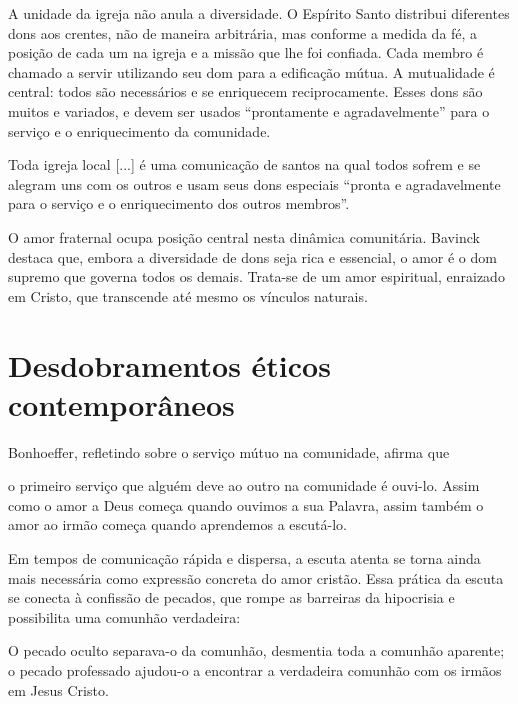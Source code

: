 A unidade da igreja não anula a diversidade. O Espírito Santo distribui diferentes dons aos crentes, não de maneira arbitrária, mas conforme a medida da fé, a posição de cada um na igreja e a missão que lhe foi confiada. \cite{bavinck2012} Cada membro é chamado a servir utilizando seu dom para a edificação mútua. A mutualidade é central: todos são necessários e se enriquecem reciprocamente. Esses dons são muitos e variados, e devem ser usados ``prontamente e agradavelmente'' para o serviço e o enriquecimento da comunidade.\cite{bavinck2012}

\begin{citacao}
    Toda igreja local [...] é uma comunicação de santos na qual todos sofrem e se alegram uns com os outros e usam seus dons especiais ``pronta e agradavelmente para o serviço e o enriquecimento dos outros membros''. \cite[p.~380]{bavinck2012}
\end{citacao}

O amor fraternal ocupa posição central nesta dinâmica comunitária. Bavinck destaca que, embora a diversidade de dons seja rica e essencial, o amor é o dom supremo que governa todos os demais. \cite[p.~304]{bavinck2012} Trata-se de um amor espiritual, enraizado em Cristo, que transcende até mesmo os vínculos naturais. \cite[p.~304]{bavinck2012}

\section{Desdobramentos éticos contemporâneos}

Bonhoeffer, refletindo sobre o serviço mútuo na comunidade, afirma que

\begin{citacao}
    o primeiro serviço que alguém deve ao outro na comunidade é ouvi-lo. Assim como o amor a Deus começa quando ouvimos a sua Palavra, assim também o amor ao irmão começa quando aprendemos a escutá-lo. \cite[pp.~75--76]{bonhoeffer1997}
\end{citacao}

Em tempos de comunicação rápida e dispersa, a escuta atenta se torna ainda mais necessária como expressão concreta do amor cristão. Essa prática da escuta se conecta à confissão de pecados, que rompe as barreiras da hipocrisia e possibilita uma comunhão verdadeira:

\begin{citacao}
    O pecado oculto separava-o da comunhão, desmentia toda a comunhão aparente; o pecado professado ajudou-o a encontrar a verdadeira comunhão com os irmãos em Jesus Cristo. \cite[p.~88]{bonhoeffer1997}
\end{citacao}

